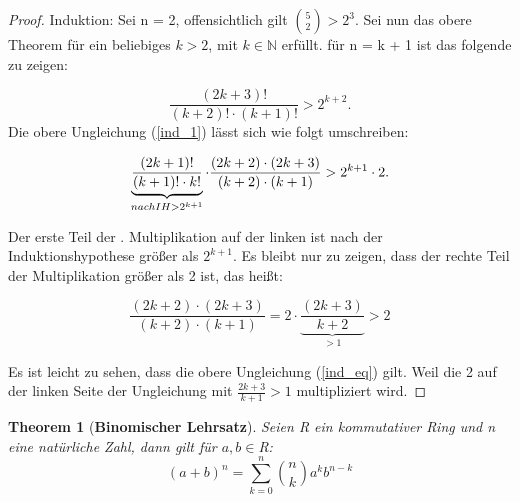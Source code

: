 \documentclass[12pt,oneside]{article}
\newtheorem{theorem}{Theorem}[section]
\theoremstyle{remark}
\theoremstyle{definition}
\begin{document}
\begin{flushleft}
\begin{flushleft}
\begin{proof}
Induktion: Sei n = 2, offensichtlich gilt ${5 \choose 2} > 2^3$. Sei nun das obere Theorem für ein beliebiges $k > 2 $, mit $ k \in \mathbb{N}$ erfüllt.\newline\newline
für n = k + 1 ist das folgende zu zeigen: 

\begin{equation}\label{ind_1}
    \frac{(2k + 3)!}{(k + 2)!\cdot(k + 1)!} > 2^{k+2}.
\end{equation}
\newline\newline
Die obere Ungleichung (\ref{ind_1}) lässt sich wie folgt umschreiben:\newline\newline


\begin{equation}
     \underbrace{\frac{(2k + 1)!}{(k + 1)! \cdot k!}}_{nach IH > 2^{k + 1}} \cdot \frac{(2k + 2) \cdot (2k + 3)}{(k + 2) \cdot (k + 1)} > 2^{k+1} \cdot 2.\newline\newline
\end{equation}

Der erste Teil der . Multiplikation auf der linken ist nach der Induktionshypothese größer als $2^{k+1}$. Es bleibt nur zu zeigen, dass der rechte Teil der Multiplikation größer als 2 ist, das heißt: \newline\newline

\begin{equation}\label{ind_eq}
\frac{(2k + 2) \cdot (2k + 3)}{(k + 2) \cdot (k + 1)} = 2 \cdot \underbrace{\frac{(2k + 3 )}{k + 2}}_{ > 1} > 2
\end{equation}

Es ist leicht zu sehen, dass die obere Ungleichung (\ref{ind_eq}) gilt. Weil die 2 auf der linken Seite der Ungleichung mit $\frac{2k + 3}{k + 1} > 1$ multipliziert wird.


\end{proof}

\end{flushleft}
\smallskip 

\begin{theorem}[\textbf{Binomischer Lehrsatz}]\label{Th_3}
Seien R ein kommutativer Ring und n eine natürliche Zahl, dann gilt für $a,b \in $R:\newline\newline
 \begin{equation}
     (a + b)^n  = \sum_{k=0}^n {n \choose k} a^k b^{n-k}
 \end{equation}
\end{theorem}


\end{flushleft}
\end{document}
